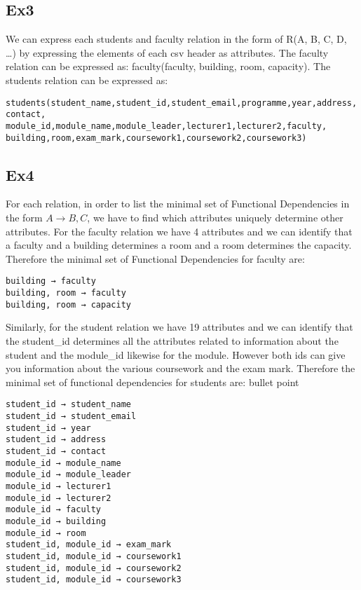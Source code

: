 \documentclass[12pt]{article}
\begin{document}
\subsection{Ex3}

We can express each students and faculty relation in the form of R(A, B, C, D, …) by expressing the elements of each csv header as attributes.
The faculty relation can be expressed as:
faculty(faculty, building, room, capacity). 
The students relation can be expressed as:  
\begin{verbatim}
students(student_name,student_id,student_email,programme,year,address,
contact, module_id,module_name,module_leader,lecturer1,lecturer2,faculty,
building,room,exam_mark,coursework1,coursework2,coursework3)
\end{verbatim}
\subsection{Ex4}

For each relation, in order to list the minimal set of Functional Dependencies in the form \( A \rightarrow B,C \),  we have to find which attributes uniquely determine other attributes. For the faculty relation we have 4 attributes and we can identify that a faculty and a building determines a room and a room determines the capacity. Therefore the minimal set of Functional Dependencies for faculty are: 
\begin{verbatim}
building → faculty
building, room → faculty
building, room → capacity 
\end{verbatim}

Similarly, for the student relation we have 19 attributes and we can identify that the student\_id determines all the attributes related to information about the student and the module\_id likewise for the module. However both ids can give you information about the various coursework and the exam mark. Therefore the minimal set of functional dependencies for students are:
bullet point
\begin{verbatim}
student_id → student_name
student_id → student_email
student_id → year
student_id → address
student_id → contact
module_id → module_name
module_id → module_leader 
module_id → lecturer1 
module_id → lecturer2 
module_id → faculty
module_id → building
module_id → room
student_id, module_id → exam_mark
student_id, module_id → coursework1
student_id, module_id → coursework2
student_id, module_id → coursework3
\end{verbatim}
\end{document}
